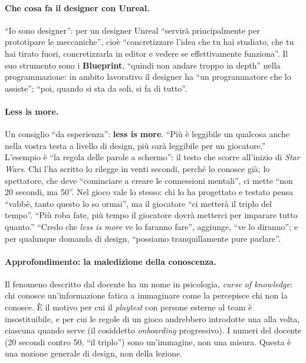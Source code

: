 \paragraph{Che cosa fa il designer con Unreal.} ``Io sono designer'': per un designer
Unreal ``servirà principalmente per prototipare le meccaniche'', cioè ``concretizzare
l'idea che tu hai studiato, che tu hai tirato fuori, concretizzarla in editor e vedere se
effettivamente funziona''. Il suo strumento sono i \textbf{Blueprint}, ``quindi non andare
troppo in depth'' nella programmazione: in ambito lavorativo il designer ha ``un
programmatore che lo assiste''; ``poi, quando si sta da soli, si fa di tutto''.

\paragraph{Less is more.} Un consiglio ``da esperienza'': \textbf{less is more}. ``Più è
leggibile un qualcosa anche nella vostra testa a livello di design, più sarà leggibile per
un giocatore.'' L'esempio è ``la regola delle parole a schermo'': il testo che scorre
all'inizio di \emph{Star Wars}. Chi l'ha scritto lo rilegge in venti secondi, perché lo
conosce già; lo spettatore, che deve ``cominciare a creare le connessioni mentali'', ci
mette ``non 20 secondi, ma 50''. Nel gioco vale lo stesso: chi lo ha progettato e testato
pensa ``vabbè, tanto questo lo so ormai'', ma il giocatore ``ci metterà il triplo del
tempo''. ``Più roba fate, più tempo il giocatore dovrà metterci per imparare tutto
quanto.'' ``Credo che \emph{less is more} ve lo faranno fare'', aggiunge, ``ve lo
diranno''; e per qualunque domanda di design, ``possiamo tranquillamente pure parlare''.

\paragraph{Approfondimento: la maledizione della conoscenza.} Il fenomeno descritto dal
docente ha un nome in psicologia, \emph{curse of knowledge}: chi conosce un'informazione
fatica a immaginare come la percepisce chi non la conosce. È il motivo per cui il
\emph{playtest} con persone esterne al team è insostituibile, e per cui le regole di un
gioco andrebbero introdotte una alla volta, ciascuna quando serve (il cosiddetto
\emph{onboarding} progressivo). I numeri del docente (20 secondi contro 50, ``il
triplo'') sono un'immagine, non una misura. Questa è una nozione generale di design, non
della lezione.


